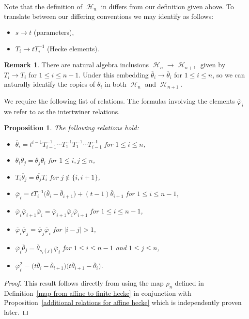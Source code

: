 \documentclass[10pt,a4paper]{amsart}
\numberwithin{equation}{section}
\newtheorem{Proposition}[Theorem]{Proposition}
\theoremstyle{definition}
\newtheorem{Remark}[Theorem]{Remark}
\DeclareMathOperator{\sH}{\mathscr{H}}
\begin{document}
Note that the definition of $\sH_n$ in \cite[Section~2.1]{DL_2011} differs from our definition given above. To translate between our differing conventions we may identify as follows:
\begin{itemize}\itemsep=0pt
 \item $s \rightarrow t$ (parameters),
 \item $T_i \rightarrow tT_i^{-1}$ (Hecke elements).
\end{itemize}


\begin{Remark}
 There are natural algebra inclusions $\sH_{n} \rightarrow \sH_{n+1}$ given by $T_i \rightarrow T_i$ for $1\leq i \leq n-1$. Under this embedding $\overline{\theta}_i \rightarrow \overline{\theta}_i$ for $1 \leq i \leq n$, so we can naturally identify the copies of $\overline{\theta}_i$ in both $\sH_n$ and $\sH_{n+1}$.
\end{Remark}

We require the following list of relations. The formulas involving the elements $\overline{\varphi}_i$ we refer to as the intertwiner relations.

\begin{Proposition}\label{additional relations for finite hecke}
 The following relations hold:
 \begin{itemize}
\itemsep=0pt
 \item $\overline{\theta}_i = t^{i-1}T_{i-1}^{-1}\cdots T_{1}^{-1}T_{1}^{-1}\cdots T_{i-1}^{-1}$ for $1\leq i \leq n$,
 \item $\overline{\theta}_i\overline{\theta}_j = \overline{\theta}_j\overline{\theta}_i$ for $1\leq i,j \leq n$,
 \item $T_i\overline{\theta}_j = \overline{\theta_j}T_i$ for $j \notin \{i,i+1\}$,
 \item $\overline{\varphi}_i = tT_{i}^{-1}\bigl(\overline{\theta}_i - \overline{\theta}_{i+1}\bigr) + (t-1)\overline{\theta}_{i+1}$ for $1 \leq i \leq n-1$,
 \item $\overline{\varphi}_i\overline{\varphi}_{i+1}\overline{\varphi}_i=\overline{\varphi}_{i+1}\overline{\varphi}_i\overline{\varphi}_{i+1}$ for $1\leq i \leq n-1$,
 \item $\overline{\varphi}_i\overline{\varphi}_j = \overline{\varphi}_j\overline{\varphi}_i$ for $|i-j| >1$,
 \item $\overline{\varphi}_{i}\overline{\theta}_j = \overline{\theta}_{s_i(j)}\overline{\varphi}_{i}$ for $1\leq i \leq n-1$ and $1 \leq j \leq n$,
 \item $\overline{\varphi}_i^{2} = \bigl(t\overline{\theta}_i-\overline{\theta}_{i+1}\bigr)\bigl(t\overline{\theta}_{i+1}-\overline{\theta}_{i}\bigr)$.
 \end{itemize}
\end{Proposition}
\begin{proof}
This result follows directly from using the map $\rho_n$ defined in Definition~\ref{map from affine to finite hecke} in conjunction with Proposition~\ref{additional relations for affine hecke} which is independently proven later.
\end{proof}
\end{document}
